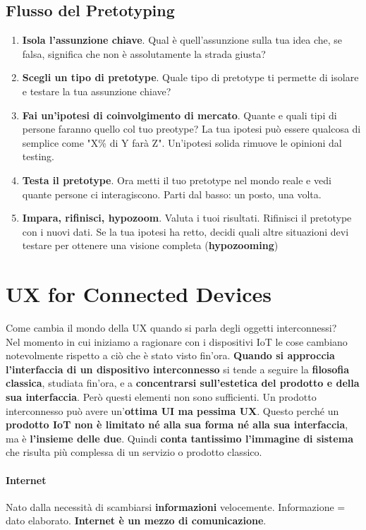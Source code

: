 \documentclass[10pt]{article}
\begin{document}
\subsection{Flusso del Pretotyping}
\begin{enumerate}
\item \textbf{Isola l'assunzione chiave}. Qual è quell'assunzione sulla tua idea che, se falsa, significa che non è assolutamente la strada giusta?
\item \textbf{Scegli un tipo di pretotype}. Quale tipo di pretotype ti permette di isolare e testare la tua assunzione chiave?
\item \textbf{Fai un'ipotesi di coinvolgimento di mercato}. Quante e quali tipi di persone faranno quello col tuo preotype? La tua ipotesi può essere qualcosa di semplice come "X\% di Y farà Z". Un'ipotesi solida rimuove le opinioni dal testing.
\item \textbf{Testa il pretotype}. Ora metti il tuo pretotype nel mondo reale e vedi quante persone ci interagiscono. Parti dal basso: un posto, una volta.
\item \textbf{Impara, rifinisci, hypozoom}. Valuta i tuoi risultati. Rifinisci il pretotype con i nuovi dati. Se la tua ipotesi ha retto, decidi quali altre situazioni devi testare per ottenere una visione completa (\textbf{hypozooming})
\end{enumerate}
\pagebreak
\section{UX for Connected Devices}
Come cambia il mondo della UX quando si parla degli oggetti interconnessi?\\
Nel momento in cui iniziamo a ragionare con i dispositivi IoT le cose cambiano notevolmente rispetto a ciò che è stato visto fin'ora.
\textbf{Quando si approccia l'interfaccia di un dispositivo interconnesso} si tende a seguire la \textbf{filosofia classica}, studiata fin'ora, e a \textbf{concentrarsi sull'estetica del prodotto e della sua interfaccia}. Però questi elementi non sono sufficienti. Un prodotto interconnesso può avere un'\textbf{ottima UI ma pessima UX}. Questo perché un \textbf{prodotto IoT non è limitato né alla sua forma né alla sua interfaccia}, ma è \textbf{l'insieme delle due}. Quindi \textbf{conta tantissimo l'immagine di sistema} che risulta più complessa di un servizio o prodotto classico.
\paragraph{Internet} Nato dalla necessità di scambiarsi \textbf{informazioni} velocemente. Informazione = dato elaborato. \textbf{Internet è un mezzo di comunicazione}.
\end{document}
